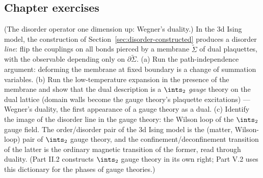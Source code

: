 \subsection*{Chapter exercises}

\begin{exercise}[classic]
\label{exr:wegner}
(The disorder operator one dimension up: Wegner's duality.) In the 3d
Ising model, the construction of Section~\ref{sec:disorder-constructed}
produces a disorder \emph{line}: flip the couplings on all bonds
pierced by a membrane $\tilde\Sigma$ of dual plaquettes, with the
observable depending only on $\partial\tilde\Sigma$. (a) Run the
path-independence argument: deforming the membrane at fixed boundary
is a change of summation variables. (b) Run the low-temperature
expansion in the presence of the membrane and show that the dual
description is a $\ints_2$ \emph{gauge} theory on the dual lattice
(domain walls become the gauge theory's plaquette excitations) ---
Wegner's duality, the first appearance of a gauge theory as a dual.
(c) Identify the image of the disorder line in the gauge theory: the
Wilson loop of the $\ints_2$ gauge field. The order/disorder pair of
the 3d Ising model is the (matter, Wilson-loop) pair of $\ints_2$
gauge theory, and the confinement/deconfinement transition of the
latter is the ordinary magnetic transition of the former, read through
duality. (Part II.2 constructs $\ints_2$ gauge theory in its own
right; Part V.2 uses this dictionary for the phases of gauge
theories.)
\end{exercise}

